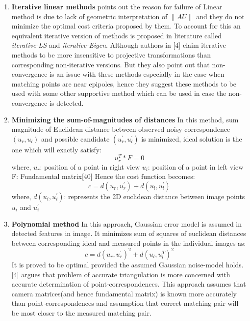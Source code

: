 \begin{enumerate}
\item \textbf{Iterative linear methods}\newline
\noindent
[4] points out the reason for failure of Linear method is due to lack of geometric interpretation of $\|AU\|$  and they do not minimize the optimal cost criteria proposed by them. To account for this an equivalent iterative version of methods is proposed in literature called \textit{iterative-LS} and \textit{iterative-Eigen}.  Although authors in [4] claim iterative methods to be more insensitive to projective transformations than corresponding non-iterative versions. But they also point out that non-convergence is an issue with these methods especially in the case when matching points are near epipoles, hence they suggest these methods to be used with some other supportive method which can be used in case the non-convergence is detected.

\item \textbf{Minimizing the sum-of-magnitudes of distances}\newline
\noindent
In this method, sum magnitude of Euclidean distance between observed noisy correspondence $(u_r,u_l)$ and possible candidate $(u_r^{'},u_l^{'})$ is minimized, ideal solution is the one which will exactly satisfy: 
\begin{equation}
u_r^T*F=0
\end{equation} 
where,\newline
$u_r$: position of a point in right view\newline
$u_l$: position of a point in left view\newline
F: Fundamental matrix[40]\newline
\noindent
Hence the cost function becomes:
\begin{equation}
c=d(u_r,u_r^{'})+d(u_l,u_l^{'})
\end{equation}
\noindent
where,\newline
$d(u_i,u_i^{'})$: represents the 2D euclidean distance between image points $u_i$ and $u_i^{'}$

\item \textbf{Polynomial method}\newline
\noindent
In this approach, Gaussian error model is assumed in detected features in image. It minimizes sum of squares of euclidean distances between corresponding ideal and measured points in the individual images as:
\begin{equation}
c=d(u_r,u_r^{'})^2+d(u_l,u_l^T)^2
\end{equation}
\noindent
It is proved to be optimal provided the assumed Gaussian noise-model holds. [4] argues that problem of accurate triangulation is more concerned with accurate determination of point-correspondences. This approach assumes that camera matrices(and hence fundamental matrix) is known more accurately than point-correspondences and assumption that correct matching pair will be most closer to the measured matching pair.  
\end{enumerate}

